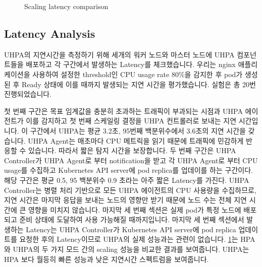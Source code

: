 \documentclass[conference]{IEEEtran}
\begin{document}
\begin{figure}[tb]
    \caption{Scaling latency comparison}
    \label{fig:scaling latency comparison}
\end{figure}

\subsection{Latency Analysis}
UHPA의 지연시간을 측정하기 위해 세개의 워커 노드와 마스터 노드에 UHPA 컴포넌트들을 배포하고 각 구간에서 발생하는 Latency를 체크했습니다. 우리는 nginx 애플리케이션을 사용하여 설정한 threshold인 CPU usage rate 80\%을 감지한 후 pod가 생성된 후 Ready 상태에 이를 때까지 발생되는 지연 시간을 평가했습니다. 실험은 총 20번 진행되었습니다.


첫 번째 구간은 목표 임계값을 충분히 초과하는 트래픽이 부과되는 시점과 UHPA 에이전트가 이를 감지하고 첫 번째 스케일링 결정을 UHPA 컨트롤러로 보내는 지연 시간입니다. 이 구간에서 UHPA는 평균 3.2초, 95번째 백분위수에서 3.6초의 지연 시간을 갖습니다. UHPA Agent는 매초마다 CPU 메트릭을 읽기 때문에 트래픽에 민감하게 반응할 수 있습니다. 따라서 짧은 탐지 시간을 보장합니다. 두 번째 구간은 UHPA Controller가 UHPA Agent로 부터 notification을 받고 각 UHPA Agent로 부터 CPU usage를 수집하고 Kubernetes API server에 pod replica를 업데이를 하는 구간이다. 해당 구간은 평균 0.5, 95 백분위수 0.9 초라는 아주 짧은 Latency를 가진다. UHPA Controller는 병렬 처리 기반으로 모든 UHPA 에이전트의 CPU 사용량을 수집하므로, 지연 시간은 마지막 응답을 보내는 노드의 영향만 받기 때문에 노드 수는 전체 지연 시간에 큰 영향을 미치지 않습니다. 마지막 세 번째 섹션은 실제 pod가 특정 노드에 배포되고 준비 상태에 도달하여 사용 가능해질 때까지입니다. 마지막 세 번째 섹션에서 발생하는 Latency는 UHPA Controller가 Kubernetes API server에 pod replica 업데이트를 요청한 후의 Latency이므로 UHPA의 실제 성능과는 관련이 없습니다. \ref{fig:scaling latency comparison}는 HPA와 UHPA의 두 가지 모드 간의 scaling 성능을 비교한 결과를 보여줍니다.  UHPA는 HPA 보다 월등히 빠른 성능과  낮은 지연시간 스펙트럼을 보여줍니다.
\end{document}
